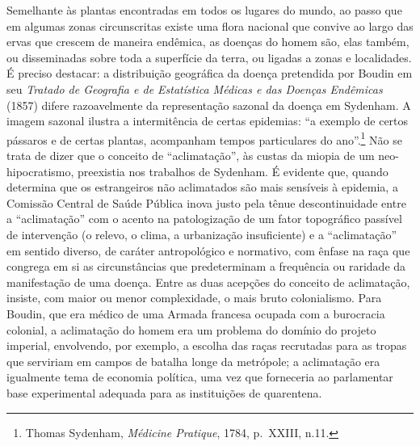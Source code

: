 Semelhante às plantas encontradas em todos os lugares do mundo, ao passo
que em algumas zonas circunscritas existe uma flora nacional que convive
ao largo das ervas que crescem de maneira endêmica, as doenças do homem
são, elas também, ou disseminadas sobre toda a superfície da terra, ou
ligadas a zonas e localidades. É preciso destacar: a distribuição
geográfica da doença pretendida por Boudin em seu \emph{Tratado de
Geografia e de Estatística Médicas e das Doenças Endêmicas} (1857)
difere razoavelmente da representação sazonal da doença em Sydenham. A
imagem sazonal ilustra a intermitência de certas epidemias: ``a exemplo
de certos pássaros e de certas plantas, acompanham tempos particulares
do ano''.\footnote{Thomas Sydenham, \emph{Médicine Pratique}, 1784,
  p.~XXIII, n.11.} Não se trata de dizer que o conceito de
``aclimatação'', às custas da miopia de um neo-hipocratismo, preexistia
nos trabalhos de Sydenham. É evidente que, quando determina que os
estrangeiros não aclimatados são mais sensíveis à epidemia, a Comissão
Central de Saúde Pública inova justo pela tênue descontinuidade entre a
``aclimatação'' com o acento na patologização de um fator topográfico
passível de intervenção (o relevo, o clima, a urbanização insuficiente)
e a ``aclimatação'' em sentido diverso, de caráter antropológico e
normativo, com ênfase na raça que congrega em si as circunstâncias que
predeterminam a frequência ou raridade da manifestação de uma doença.
Entre as duas acepções do conceito de aclimatação, insiste, com maior ou
menor complexidade, o mais bruto colonialismo. Para Boudin, que era
médico de uma Armada francesa ocupada com a burocracia colonial, a
aclimatação do homem era um problema do domínio do projeto imperial,
envolvendo, por exemplo, a escolha das raças recrutadas para as tropas
que serviriam em campos de batalha longe da metrópole; a aclimatação era
igualmente tema de economia política, uma vez que forneceria ao
parlamentar base experimental adequada para as instituições de
quarentena.


